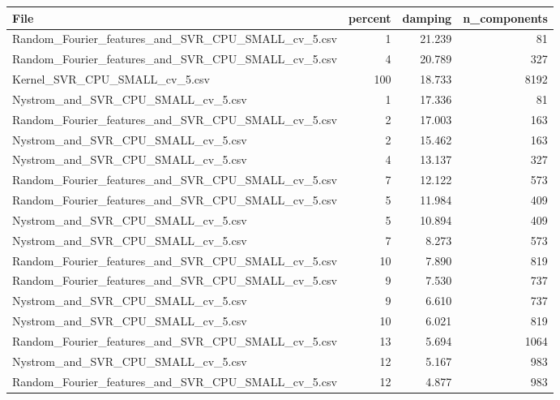 \begin{tabularx}{\textwidth}{lrrr}
\toprule
                                              File &  percent &  damping &  n\_components \\
\midrule
Random\_Fourier\_features\_and\_SVR\_CPU\_SMALL\_cv\_5.csv &        1 &   21.239 &            81 \\
Random\_Fourier\_features\_and\_SVR\_CPU\_SMALL\_cv\_5.csv &        4 &   20.789 &           327 \\
                     Kernel\_SVR\_CPU\_SMALL\_cv\_5.csv &      100 &   18.733 &          8192 \\
                Nystrom\_and\_SVR\_CPU\_SMALL\_cv\_5.csv &        1 &   17.336 &            81 \\
Random\_Fourier\_features\_and\_SVR\_CPU\_SMALL\_cv\_5.csv &        2 &   17.003 &           163 \\
                Nystrom\_and\_SVR\_CPU\_SMALL\_cv\_5.csv &        2 &   15.462 &           163 \\
                Nystrom\_and\_SVR\_CPU\_SMALL\_cv\_5.csv &        4 &   13.137 &           327 \\
Random\_Fourier\_features\_and\_SVR\_CPU\_SMALL\_cv\_5.csv &        7 &   12.122 &           573 \\
Random\_Fourier\_features\_and\_SVR\_CPU\_SMALL\_cv\_5.csv &        5 &   11.984 &           409 \\
                Nystrom\_and\_SVR\_CPU\_SMALL\_cv\_5.csv &        5 &   10.894 &           409 \\
                Nystrom\_and\_SVR\_CPU\_SMALL\_cv\_5.csv &        7 &    8.273 &           573 \\
Random\_Fourier\_features\_and\_SVR\_CPU\_SMALL\_cv\_5.csv &       10 &    7.890 &           819 \\
Random\_Fourier\_features\_and\_SVR\_CPU\_SMALL\_cv\_5.csv &        9 &    7.530 &           737 \\
                Nystrom\_and\_SVR\_CPU\_SMALL\_cv\_5.csv &        9 &    6.610 &           737 \\
                Nystrom\_and\_SVR\_CPU\_SMALL\_cv\_5.csv &       10 &    6.021 &           819 \\
Random\_Fourier\_features\_and\_SVR\_CPU\_SMALL\_cv\_5.csv &       13 &    5.694 &          1064 \\
                Nystrom\_and\_SVR\_CPU\_SMALL\_cv\_5.csv &       12 &    5.167 &           983 \\
Random\_Fourier\_features\_and\_SVR\_CPU\_SMALL\_cv\_5.csv &       12 &    4.877 &           983 \\

\end{tabularx}
